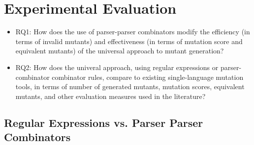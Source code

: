 \documentclass[sigconf,review, anonymous]{acmart}
\begin{document}
{\section{Experimental Evaluation}

\begin{itemize}

  \item{RQ1:}  How does the use of parser-parser combinators modify 
    the efficiency (in terms of invalid mutants) and effectiveness (in
    terms of mutation score and equivalent mutants) of the universal
    approach to mutant generation?

\item{RQ2:}  How does the univeral approach, using regular expressions
  or parser-combinator combinator rules, compare to existing
  single-language mutation tools, in terms of number of generated
  mutants, mutation scores, equivalent mutants, and other evaluation measures used in the literature?
    
  \end{itemize} 

\subsection{Regular Expressions vs. Parser Parser Combinators}

\begin{table}[hbtp]
\centering
\caption{C++ (Regex vs. Comby)}
\label{tab:table_cpp1}
\end{table}}
\end{document}
